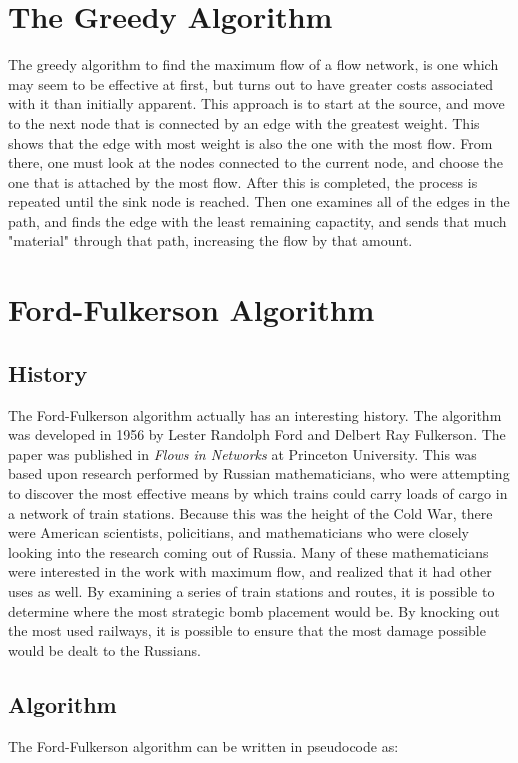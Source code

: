 \documentclass[conference]{IEEEtran}
\begin{document}
\section{The Greedy Algorithm}
The greedy algorithm to find the maximum flow of a flow network, is one which may seem to be effective at first, but turns out to have greater costs associated with it than initially apparent. This approach is to start at the source, and move to the next node that is connected by an edge with the greatest weight. This shows that the edge with most weight is also the one with the most flow. From there, one must look at the nodes connected to the current node, and choose the one that is attached by the most flow. After this is completed, the process is repeated until the sink node is reached. Then one examines all of the edges in the path, and finds the edge with the least remaining capactity, and sends that much "material" through that path, increasing the flow by that amount.

\section{Ford-Fulkerson Algorithm}
\subsection{History}
The Ford-Fulkerson algorithm actually has an interesting history. 
The algorithm was developed in 1956 by Lester Randolph Ford and Delbert Ray Fulkerson. The paper was published in \textit{Flows in Networks} at Princeton University. This was based upon research performed by Russian mathematicians, who were attempting to discover the most effective means by which trains could carry loads of cargo in a network of train stations. Because this was the height of the Cold War, there were American scientists, policitians, and mathematicians who were closely looking into the research coming out of Russia. Many of these mathematicians were interested in the work with maximum flow, and realized that it had other uses as well. By examining a series of train stations and routes, it is possible to determine where the most strategic bomb placement would be. By knocking out the most used railways, it is possible to ensure that the most damage possible would be dealt to the Russians.

\subsection{Algorithm}
The Ford-Fulkerson algorithm can be written in pseudocode\cite{CLRS:2001} as:
\end{document}
